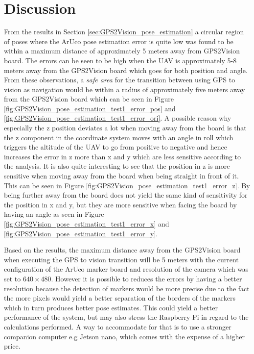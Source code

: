 \documentclass[../Head/report.tex]{subfiles}
\begin{document}
\section{Discussion}

From the results in Section \ref{sec:GPS2Vision_pose_estimation} a circular region of poses where the ArUco pose estimation error is quite low was found to be within a maximum distance of approximately 5 meters away from GPS2Vision board. The errors can be seen to be high when the UAV is approximately 5-8 meters away from the GPS2Vision board which goes for both position and angle. From these observations, a \textit{safe area} for the transition between using GPS to vision as navigation would be within a radius of approximately five meters away from the GPS2Vision board which can be seen in Figure \ref{fig:GPS2Vision_pose_estimation_test1_error_pos} and \ref{fig:GPS2Vision_pose_estimation_test1_error_ori}. A possible reason why especially the z position deviates a lot when moving away from the board is that the z component in the coordinate system moves with an angle in roll which triggers the altitude of the UAV to go from positive to negative and hence increases the error in z more than x and y which are less sensitive according to the analysis. It is also quite interesting to see that the position in z is more sensitive when moving away from the board when being straight in front of it. This can be seen in Figure \ref{fig:GPS2Vision_pose_estimation_test1_error_z}. By being further away from the board does not yield the same kind of sensitivity for the position in x and y, but they are more sensitive when facing the board by having an angle as seen in Figure \ref{fig:GPS2Vision_pose_estimation_test1_error_x} and \ref{fig:GPS2Vision_pose_estimation_test1_error_y}.   

Based on the results, the maximum distance away from the GPS2Vision board when executing the GPS to vision transition will be 5 meters with the current configuration of the ArUco marker board and resolution of the camera which was set to $640 \times 480$. However it is possible to reduces the errors by having a better resolution because the detection of markers would be more precise due to the fact the more pixels would yield a better separation of the borders of the markers which in turn produces better pose estimates. This could yield a better performance of the system, but may also stress the Raspberry Pi in regard to the calculations performed. A way to accommodate for that is to use a stronger companion computer e.g Jetson nano, which comes with the expense of a higher price.
\end{document}
